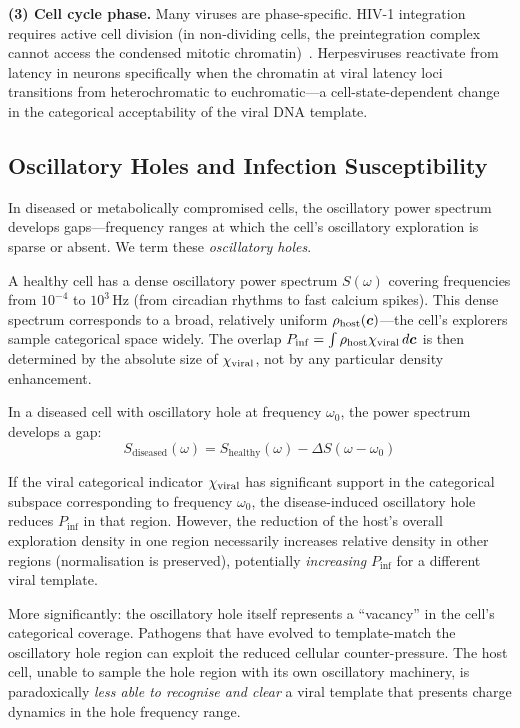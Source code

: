\textbf{(3) Cell cycle phase.} Many viruses are phase-specific. HIV-1 integration requires active cell division (in non-dividing cells, the preintegration complex cannot access the condensed mitotic chromatin)~\cite{Weinberg1991}. Herpesviruses reactivate from latency in neurons specifically when the chromatin at viral latency loci transitions from heterochromatic to euchromatic---a cell-state-dependent change in the categorical acceptability of the viral DNA template.

\subsection{Oscillatory Holes and Infection Susceptibility}

In diseased or metabolically compromised cells, the oscillatory power spectrum develops gaps---frequency ranges at which the cell's oscillatory exploration is sparse or absent. We term these \emph{oscillatory holes}.

A healthy cell has a dense oscillatory power spectrum $S(\omega)$ covering frequencies from $10^{-4}$ to $10^3$\,Hz (from circadian rhythms to fast calcium spikes). This dense spectrum corresponds to a broad, relatively uniform $\rho_{\mathrm{host}}(\boldsymbol{c})$---the cell's explorers sample categorical space widely. The overlap $P_{\mathrm{inf}} = \int \rho_{\mathrm{host}} \chi_{\mathrm{viral}}\,d\boldsymbol{c}$ is then determined by the absolute size of $\chi_{\mathrm{viral}}$, not by any particular density enhancement.

In a diseased cell with oscillatory hole at frequency $\omega_0$, the power spectrum develops a gap:
\begin{equation}
  S_{\mathrm{diseased}}(\omega) = S_{\mathrm{healthy}}(\omega) - \Delta S(\omega - \omega_0)
\end{equation}

If the viral categorical indicator $\chi_{\mathrm{viral}}$ has significant support in the categorical subspace corresponding to frequency $\omega_0$, the disease-induced oscillatory hole reduces $P_{\mathrm{inf}}$ in that region. However, the reduction of the host's overall exploration density in one region necessarily increases relative density in other regions (normalisation is preserved), potentially \emph{increasing} $P_{\mathrm{inf}}$ for a different viral template.

More significantly: the oscillatory hole itself represents a ``vacancy'' in the cell's categorical coverage. Pathogens that have evolved to template-match the oscillatory hole region can exploit the reduced cellular counter-pressure. The host cell, unable to sample the hole region with its own oscillatory machinery, is paradoxically \emph{less able to recognise and clear} a viral template that presents charge dynamics in the hole frequency range.

